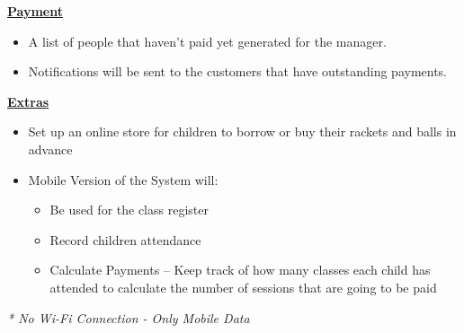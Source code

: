 \documentclass{l3proj}
\begin{document}
\textbf{\underline{Payment}}
	\begin{itemize}
	\item A list of people that haven’t paid yet generated for the manager.
	\item Notifications will be sent to the customers that have outstanding payments.
	\end{itemize}
\textbf{\underline{Extras}}
	\begin{itemize}
		\item Set up an online store for children to borrow or buy their rackets and balls in advance
		\item Mobile Version of the System will:
		\begin{itemize}
			\item Be used for the class register
			\item Record children attendance
			\item Calculate Payments -- Keep track of how many classes each child has attended to calculate the number of sessions that are going to be paid
		\end{itemize}
	\end{itemize}
\emph{* No Wi-Fi Connection - Only Mobile Data}\\
\noindent\makebox[\linewidth]{\rule{\paperwidth}{0.4pt}}
\end{document}

